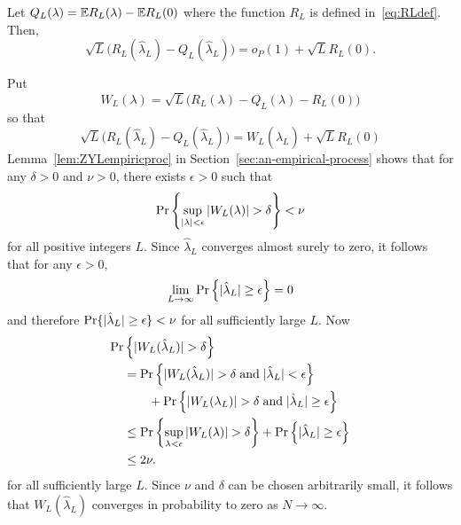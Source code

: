 \documentclass[journal]{IEEEtran}
\begin{document}
\begin{lemma}\label{lem:empiricprocc} Let $Q_L(\lambda) = {\mathbb E} R_L(\lambda) - {\mathbb E} R_L(0)$ where the function $R_L$ is defined in~\eqref{eq:RLdef}.  Then,
\[
\sqrt{L}\big( R_L(\hat{\lambda}_L) - Q_L(\hat{\lambda}_L) \big) = o_P(1) + \sqrt{L} R_L(0).
\]
\end{lemma}
\begin{IEEEproof}
Put 
\begin{equation}\label{eq:WLdef}
W_L(\lambda) = \sqrt{L}\big( R_L(\lambda) - Q_L(\lambda) - R_L(0) \big)
\end{equation}
so that
\[
\sqrt{L}\big( R_L(\hat{\lambda}_L) - Q_L(\hat{\lambda}_L) \big) = W_L(\hat{\lambda}_L) + \sqrt{L} R_L(0)
\]
Lemma~\ref{lem:ZYLempiricproc} in Section~\ref{sec:an-empirical-process} shows that for any $\delta > 0$ and $\nu > 0$, there exists $\epsilon > 0$ such that
\[
\Pr\left\{ \sup_{{\vert \lambda \vert}<\epsilon}{\vert W_L(\lambda) \vert} > \delta  \right\} < \nu
\]
for all positive integers $L$.  Since $\hat{\lambda}_L$ converges almost surely to zero, it follows that for any $\epsilon > 0$,
\[
\lim_{L\rightarrow\infty}{\operatorname{Pr}}\left\{ {\vert \hat{\lambda}_L \vert} \geq \epsilon \right\} = 0
\] 
and therefore ${\operatorname{Pr}}\{ {\vert \hat{\lambda}_L \vert} \geq \epsilon \} < \nu$ for all sufficiently large $L$.  Now
\begin{align*}
  {\operatorname{Pr}}&\left\{{\vert  W_L(\hat{\lambda}_L)  \vert} > \delta \right\} \\
&= {\operatorname{Pr}}\left\{ {\vert W_L(\hat{\lambda}_L) \vert} > \delta \;\text{and} \; {\vert \hat{\lambda}_L \vert} < \epsilon \right\} \\
&\hspace{0.7cm} + {\operatorname{Pr}}\left\{ {\vert W_L(\lambda_L) \vert} > \delta  \;\text{and} \; {\vert \hat{\lambda}_L \vert} \geq \epsilon \right\} \\
&\leq {\operatorname{Pr}}\left\{  \sup_{\lambda < \epsilon} {\vert  W_L(\lambda)  \vert} > \delta \right\} + {\operatorname{Pr}}\left\{ {\vert \hat{\lambda}_L \vert} \geq \epsilon \right\} \\
&\leq 2\nu.
\end{align*}
for all sufficiently large $L$.  Since $\nu$ and $\delta$ can be chosen arbitrarily small, it follows that $W_L(\hat{\lambda}_L)$ converges in probability to zero as $N\rightarrow\infty$.
\end{IEEEproof}
\end{document}
